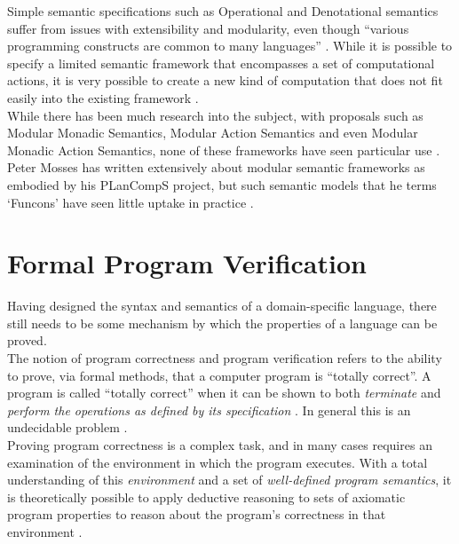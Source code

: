 Simple semantic specifications such as Operational and Denotational semantics suffer from issues with extensibility and modularity, even though ``various programming constructs are common to many languages'' \citep{Churchill:2014:RCS:2577080.2577099,Zhang:2004:SSD:981009.981013,mosses2001varieties,mosses2004modular}. 
While it is possible to specify a limited semantic framework that encompasses a set of computational actions, it is very possible to create a new kind of computation that does not fit easily into the existing framework \citep{wansbrough1997modular}. \\

While there has been much research into the subject, with proposals such as Modular Monadic Semantics, Modular Action Semantics and even Modular Monadic Action Semantics, none of these frameworks have seen particular use \citep{wansbrough1997modular,mosses1992action,Zhang:2004:SSD:981009.981013,Mosses:2009:CS:1596486.1596489,mosses2001varieties}.
Peter Mosses has written extensively about modular semantic frameworks as embodied by his PLanCompS project, but such semantic models that he terms `Funcons' have seen little uptake in practice \citep{Mosses:2009:CS:1596486.1596489,Churchill:2014:RCS:2577080.2577099,Binsbergen:2016:TSC:2892664.2893464}.




\section{Formal Program Verification} %
\label{sec:formal_program_verification}
Having designed the syntax and semantics of a domain-specific language, there still needs to be some mechanism by which the properties of a language can be proved. \\

The notion of program correctness and program verification refers to the ability to prove, via formal methods, that a computer program is ``totally correct''.
A program is called ``totally correct'' when it can be shown to both \textit{terminate} and \textit{perform the operations as defined by its specification} \citep{manna1974axiomatic}.
In general this is an undecidable problem \citep{walther1994proving}.\\

Proving program correctness is a complex task, and in many cases requires an examination of the environment in which the program executes.
With a total understanding of this \textit{environment} and a set of \textit{well-defined program semantics}, it is theoretically possible to apply deductive reasoning to sets of axiomatic program properties to reason about the program's correctness in that environment \citep{Hoare:1969:ABC:363235.363259}.\\

